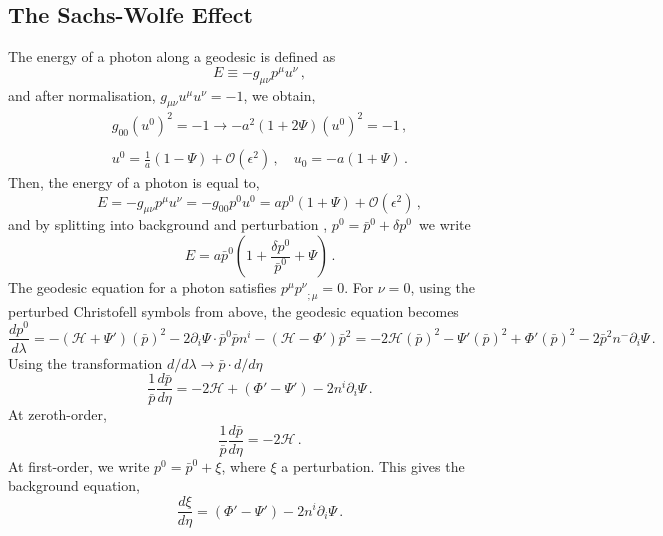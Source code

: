 \documentclass{book}
\begin{document}
	\subsection*{The Sachs-Wolfe Effect}
	\label{SW_effect}
	The energy of a photon along a geodesic is defined as
	\begin{equation}
		E\equiv -g_{\mu\nu}p^\mu u^\nu \, ,
	\end{equation}
	and after normalisation, $g_{\mu\nu}u^\mu u^\nu = -1$, we obtain,
	\begin{equation}
		\begin{array}{c}
			g_{00}\left( u^0 \right)^2=-1 \to -a^2 (1+2\Psi)\left( u^0 \right)^2 = -1 \, ,  \\ \, \\
			u^0=\frac{1}{a}(1-\Psi)+\mathcal{O}(\epsilon^2) \, , \quad u_0=-a(1+\Psi) \, .
		\end{array}
	\end{equation}
	Then, the energy of a photon is equal to,
	\begin{equation}
		E=-g_{\mu\nu}p^\mu u^\nu = - g_{00}p^0 u^0 = ap^0 (1+\Psi)+\mathcal{O}(\epsilon^2) \, ,
	\end{equation}
	and by splitting into background and perturbation \cite{Sachs:1967er}, $p^0=\bar p^0 + \delta p^0$\, we write
	\begin{equation}
		E=a\bar p^0 \left( 1 + \frac{\delta p^0}{\bar p^0} + \Psi \right) \, .
	\end{equation}
	The geodesic equation for a photon satisfies $p^\mu {p^\nu}_{;\mu}=0$. For $\nu=0$, using the perturbed Christofell symbols from above, the geodesic equation becomes
	\begin{equation}
		\frac{dp^0}{d\lambda}=-(\mathcal{H}+\Psi')(\bar p)^2-2\partial_i \Psi \cdot \bar p^0 \bar p n^i - (\mathcal{H}-\Phi')\bar p^2 = -2\mathcal{H}(\bar p )^2 -\Psi'(\bar p)^2 + \Phi'(\bar p )^2 -2\bar p^2n^-\partial_i \Psi \, .
	\end{equation}
	Using the transformation $d/d\lambda\to \bar p \cdot d/d\eta$\,
	\begin{equation}
		\frac{1}{\bar p}\frac{d\bar p}{d\eta}=-2\mathcal{H}+(\Phi'-\Psi')-2n^i\partial_i \Psi \, .
	\end{equation}
	At zeroth-order, 
	\begin{equation}
		\frac{1}{\bar p}\frac{d\bar p}{d\eta}=-2\mathcal{H} \, .
	\end{equation}
	At first-order, we write $p^0=\bar p^0+\xi$, where $\xi$ a perturbation. This gives the background equation,
	\begin{equation}
		\label{backrgounrd_equation}
		\frac{d\xi}{d\eta}=(\Phi'-\Psi')-2n^i\partial_i \Psi \, .
	\end{equation}
\end{document}
